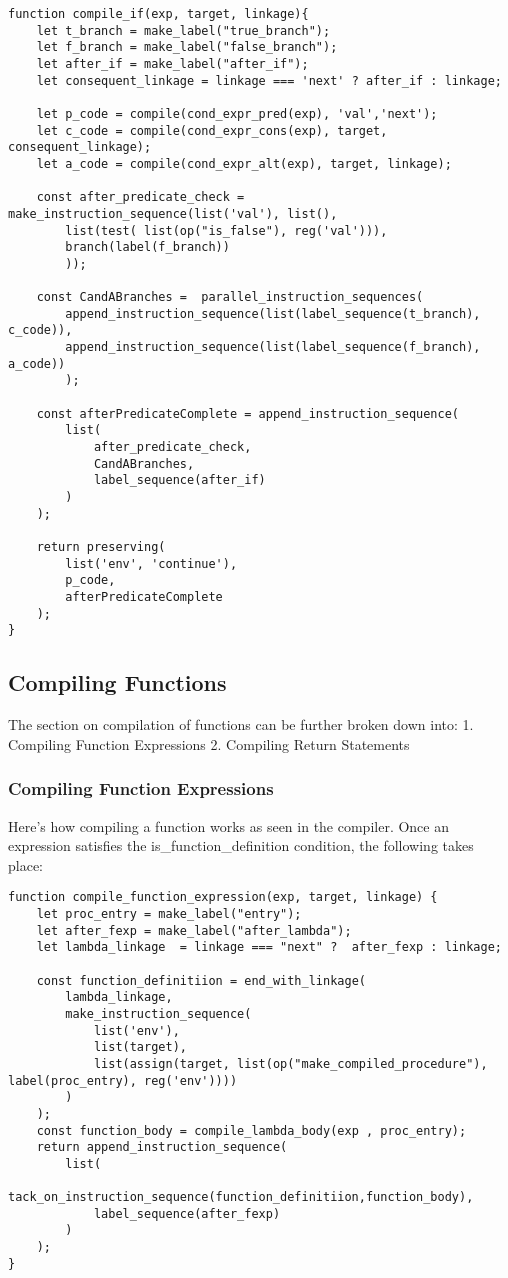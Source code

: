 \begin{lstlisting}[caption=compilie if]
function compile_if(exp, target, linkage){
    let t_branch = make_label("true_branch");
    let f_branch = make_label("false_branch");
    let after_if = make_label("after_if");
    let consequent_linkage = linkage === 'next' ? after_if : linkage;

    let p_code = compile(cond_expr_pred(exp), 'val','next');
    let c_code = compile(cond_expr_cons(exp), target, consequent_linkage);
    let a_code = compile(cond_expr_alt(exp), target, linkage);
    
    const after_predicate_check = make_instruction_sequence(list('val'), list(), 
    	list(test( list(op("is_false"), reg('val'))),
        branch(label(f_branch))
        ));

    const CandABranches =  parallel_instruction_sequences( 
		append_instruction_sequence(list(label_sequence(t_branch), c_code)), 
		append_instruction_sequence(list(label_sequence(f_branch), a_code)) 
		);

    const afterPredicateComplete = append_instruction_sequence(
        list(
            after_predicate_check,
            CandABranches,
            label_sequence(after_if)
        )
    );

    return preserving(
        list('env', 'continue'),
        p_code,
        afterPredicateComplete
    );
}
\end{lstlisting}

\subsection{Compiling Functions}
The section on compilation of functions can be further broken down into:
1. Compiling Function Expressions
2. Compiling Return Statements

\subsubsection{Compiling Function Expressions}
Here's how compiling a function works as seen in the compiler. Once an expression satisfies the is\_function\_definition condition, the following takes place:

\begin{lstlisting}[caption=compile function expression]
function compile_function_expression(exp, target, linkage) {
    let proc_entry = make_label("entry");
    let after_fexp = make_label("after_lambda");
    let lambda_linkage  = linkage === "next" ?  after_fexp : linkage;

    const function_definitiion = end_with_linkage(
        lambda_linkage,
        make_instruction_sequence(
            list('env'),
            list(target),
            list(assign(target, list(op("make_compiled_procedure"), label(proc_entry), reg('env'))))
        )
    );
    const function_body = compile_lambda_body(exp , proc_entry);
    return append_instruction_sequence(
        list(
            tack_on_instruction_sequence(function_definitiion,function_body),
            label_sequence(after_fexp)
        )
    );
}
\end{lstlisting}

